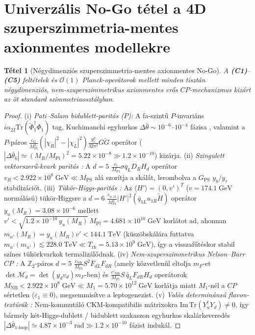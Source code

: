 \documentclass[11pt,a4paper]{article}
\newtheorem{theorem}{Tétel}[section]
\begin{document}
\section{Univerzális No-Go tétel a 4D szuperszimmetria-mentes axionmentes modellekre}

\begin{theorem}[Négydimenziós szuperszimmetria-mentes axionmentes No-Go]
A \textbf{(C1)}--\textbf{(C5)} feltételek és $\mathcal{O}(1)$ Planck-operátorok mellett minden tisztán négydimenziós, nem-szuperszimmetrikus axionmentes erős $CP$-mechanizmus kizárt az öt standard szimmetriaosztályban.
\end{theorem}

\begin{proof}
(i) \emph{Pati--Salam bidublett-paritás ($P$):} A fa-szintű $P$-invariáns $i\alpha_{2I}\mathrm{Tr}(\tilde{\Phi}_1^\dagger\Phi_1)$ tag, Kuchimanchi egyhurkos $\Delta\bar{\theta} \sim 10^{-6}\text{--}10^{-4}$ fázisa \cite{Kuchimanchi1996}, valamint a $P$-páros $\frac{c_G}{M_{\mathrm{Pl}}^2}(|\chi_R|^2-|\chi_L|^2)\frac{g_s^2}{32\pi^2}G\tilde{G}$ operátor ($|\Delta\bar{\theta}_6| \simeq (M_R/M_{\mathrm{Pl}})^2 = 5.22\times 10^{-8} \gg 1.2\times 10^{-10}$) kizárja.
(ii) \emph{Szingulett vektorszerű-kvark paritás \cite{BabuMohapatra1990}:} A $d=5$ $\frac{c_5}{M_{\mathrm{Pl}}}\sigma\bar{q}_L D_R H_d$ operátor $v_R < 2.922\times 10^8\;\mathrm{GeV} \ll M_{\mathrm{PS}}$ alá szorítja a skálát, lerombolva a $G_{\mathrm{PS}}$ $y_b/y_\tau$ stabilizációt.
(iii) \emph{Tükör-Higgs-paritás \cite{BarrChangSenjanovic1991,HallHarigaya2018}:} Az $\langle H'\rangle = (0,v')^T$ ($v = 174.1\;\mathrm{GeV}$ normálású) tükör-Higgsre a $d=6$ $\frac{c_{u,11}}{M_{\mathrm{Pl}}^2}|H'|^2(\bar{q}_{1L}u_{1R}\tilde{H})$ operátor $y_u(M_R) = 3.08\times 10^{-6}$ mellett $v' < \sqrt{1.2\times 10^{-10}\,y_u(M_R)}\,M_{\mathrm{Pl}} = 4.681\times 10^{10}\;\mathrm{GeV}$ korlátot ad, ahonnan $m_{u'}(M_R) = y_u(M_R)v' < 144.1\;\mathrm{TeV}$ (küszöbskálára futtatva $m_{u'}(m_{u'}) \lesssim 228.0\;\mathrm{TeV} \ll T_{\mathrm{rh}} = 5.13\times 10^9\;\mathrm{GeV}$), így a visszafűtéskor stabil színes tükörkvarkok termalizálódnak.
(iv) \emph{Nem-szuperszimmetrikus Nelson--Barr $CP$ \cite{Nelson1984,Barr1984,BentoBrancoParada1991,DineKramerNir1997}:} A $\mathbb{Z}_2$-páros $d=5$ $\frac{c_{\mathrm{NB}}}{M_{\mathrm{Pl}}}S^2\overline{F}_{dL}F_{dR}$ (amely közvetlenül eltolja $m_F$-et $\det\mathcal{M}_d = \det(y_d v_d)m_F$-ben) és $\frac{c'_{\mathrm{NB}}}{M_{\mathrm{Pl}}}S\,\bar{q}_L F_{dR}H_d$ operátorok $M_{\mathrm{NB}} < 2.922\times 10^8\;\mathrm{GeV} \ll M_1 = 5.70\times 10^{12}\;\mathrm{GeV}$ korlátja miatt $M_1$-nél a $CP$ sértetlen ($\varepsilon_1 \equiv 0$), megsemmisítve a leptogenezist.
(v) \emph{Valós determinánsú flavon-textúrák \cite{AntuschSpinrath2011}:} Nem-kommutáló CKM-kompatibilis mátrixokra $\mathrm{Im}\,\mathrm{Tr}(Y_u^\dagger Y_d) \neq 0$, így bármely két-Higgs-dublett / bidublett szakaszon egyhurkos skalárkeveredés $|\Delta\bar{\theta}_{\text{1-loop}}| \simeq 4.87\times 10^{-3}\;\mathrm{rad} \gg 1.2\times 10^{-10}$ fázist indukál. \qedhere
\end{proof}
\end{document}
